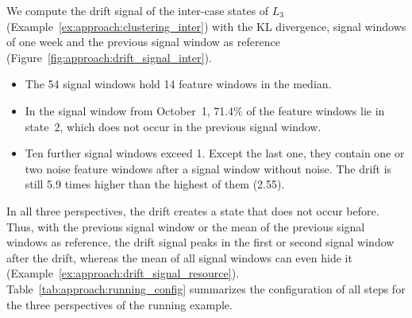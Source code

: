 \begin{example}
	\label{ex:approach:drift_signal_inter}
	We compute the drift signal of the inter-case states of $L_3$ (Example~\ref{ex:approach:clustering_inter}) with the KL divergence, signal windows of one week and the previous signal window as reference (Figure~\ref{fig:approach:drift_signal_inter}).
	\begin{itemize}
		\item The 54 signal windows hold 14 feature windows in the median.

		\item In the signal window from October~1, 71.4\% of the feature windows lie in state~2, which does not occur in the previous signal window.

		\item Ten further signal windows exceed 1. Except the last one, they contain one or two noise feature windows after a signal window without noise. The drift is still 5.9 times higher than the highest of them (2.55).
	\end{itemize}
\end{example}

In all three perspectives, the drift creates a state that does not occur before. Thus, with the previous signal window or the mean of the previous signal windows as reference, the drift signal peaks in the first or second signal window after the drift, whereas the mean of all signal windows can even hide it (Example~\ref{ex:approach:drift_signal_resource}). Table~\ref{tab:approach:running_config} summarizes the configuration of all steps for the three perspectives of the running example.

